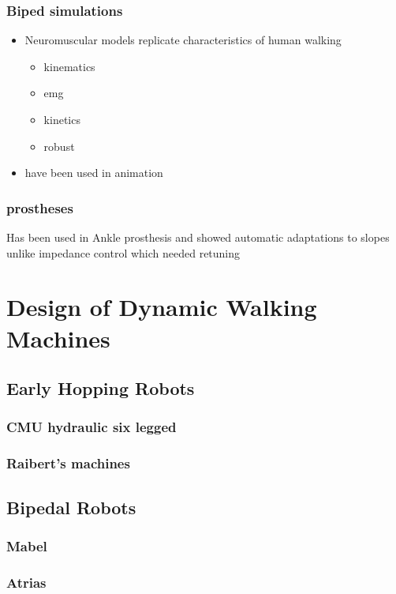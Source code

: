 \subsubsection{Biped simulations}
    \begin{itemize}
        \item Neuromuscular models replicate characteristics of human walking
        \begin{itemize}
            \item kinematics
            \item emg
            \item kinetics
            \item robust
        \end{itemize}

        \item have been used in animation
    \end{itemize}

\subsubsection{prostheses}
    Has been used in Ankle prosthesis and showed automatic adaptations to slopes
    unlike impedance control which needed retuning


\section{Design of Dynamic Walking Machines}

\subsection{Early Hopping Robots}
\subsubsection{CMU hydraulic six legged}
\subsubsection{Raibert's machines}

\subsection{Bipedal Robots}
\subsubsection{Mabel}
\subsubsection{Atrias}

